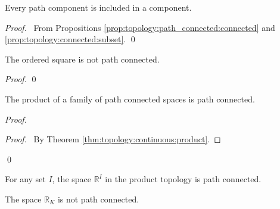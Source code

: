 \begin{prop}
  Every path component is included in a component.
\end{prop}

\begin{proof}
  \pf\ From Propositions \ref{prop:topology:path_connected:connected} and
  \ref{prop:topology:connected:subset}. \qed
\end{proof}

 \begin{prop}
The ordered square is not path connected.
\end{prop}

\begin{proof}
\pf
{}
\qed
\end{proof}

 \begin{prop}[AC]
   \label{prop:topology:path_conected:product}
The product of a family of path connected spaces is path connected.
\end{prop}

\begin{proof}
\pf
{}
\begin{proof}
  \pf\ By Theorem \ref{thm:topology:continuous:product}.
\end{proof}
\qed
\end{proof}

\begin{cor}
 For any set $I$, the space $\mathbb{R}^I$ in the product topology is path connected.
\end{cor}

\begin{prop}
The space $\mathbb{R}_K$ is not path connected.
\end{prop}

